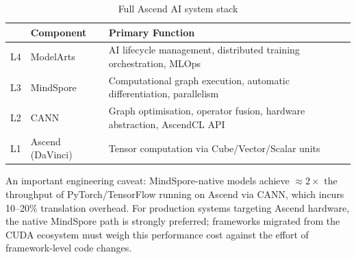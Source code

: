\begin{table}[htbp]
  \centering
  \caption{Full Ascend AI system stack}
  \label{tab:ascend-stack}
  \begin{tabularx}{\textwidth}{llX}
    \toprule
    \tableheader{Layer & Component & Primary Function} \\
    \midrule
    L4 & ModelArts      & AI lifecycle management, distributed training orchestration, MLOps \\
    \rowcolor{TableRowOdd}
    L3 & MindSpore      & Computational graph execution, automatic differentiation, parallelism \\
    L2 & CANN           & Graph optimisation, operator fusion, hardware abstraction, AscendCL API \\
    \rowcolor{TableRowOdd}
    L1 & Ascend (DaVinci) & Tensor computation via Cube/Vector/Scalar units \\
    \bottomrule
  \end{tabularx}
\end{table}

An important engineering caveat: MindSpore-native models achieve
$\approx 2\times$ the throughput of PyTorch/TensorFlow running on Ascend
via CANN, which incurs 10–20\% translation overhead. For production
systems targeting Ascend hardware, the native MindSpore path is strongly
preferred; frameworks migrated from the CUDA ecosystem must weigh this
performance cost against the effort of framework-level code changes.
